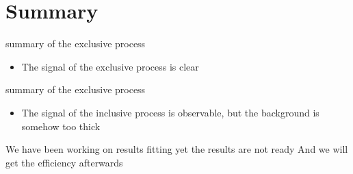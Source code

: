 \documentclass{beamer}
\begin{document}
\section{Summary}
\begin{frame}
\begin{block}{summary of the exclusive process}
\begin{itemize}
\item The signal of the exclusive process is clear
\end{itemize}
\end{block}
\begin{block}{summary of the exclusive process}
\begin{itemize}
\item The signal of the inclusive process is observable, but the background is somehow too thick
\end{itemize}
\end{block}
\bigskip
We have been working on results fitting yet the results are not ready
And we will get the efficiency afterwards
\end{frame}
\end{document}
